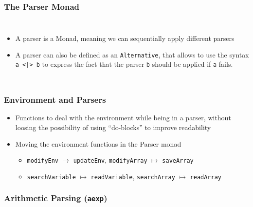 \documentclass{beamer}
\begin{document}
\begin{frame}
	\frametitle{The Parser Monad}
	\begin{columns}
		\footnotesize
		\begin{itemize}
			\item A parser is a Monad, meaning we can sequentially apply
				different parsers
			\item A parser can also be defined as an \texttt{Alternative}, that
				allows to use the syntax \lstinline{a <|> b} to express the
				fact that the parser \texttt{b} should be applied if \texttt{a}
				fails.
		\end{itemize}
		
		
	\end{columns}
\end{frame}

\begin{frame}
	\frametitle{Environment and Parsers}
	\begin{itemize}
		\footnotesize
		\item Functions to deal with the environment while being in a parser,
			without loosing the possibility of using ``do-blocks'' to improve
			readability
		\item Moving the environment functions in the Parser monad
			\begin{itemize}
				\item \lstinline{modifyEnv} $\mapsto$ \lstinline{updateEnv},
					\lstinline{modifyArray} $\mapsto$ \lstinline{saveArray}
				\item \lstinline{searchVariable} $\mapsto$ \lstinline{readVariable},
					\lstinline{searchArray} $\mapsto$ \lstinline{readArray}
			\end{itemize}
	\end{itemize}
	
	
	
	
\end{frame}

\begin{frame}
	\frametitle{Arithmetic Parsing (\texttt{aexp})}
	\begin{columns}
		\column{0.4\textwidth}
		
		
		\column{0.6\textwidth}
		
	\end{columns}
\end{frame}
\end{document}

